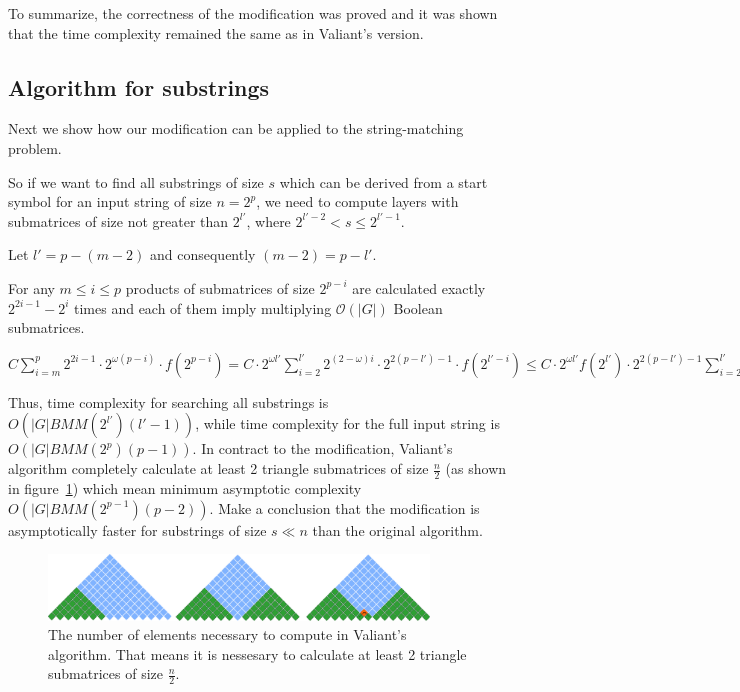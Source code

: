 To summarize, the correctness of the modification was proved and it was shown that the time complexity remained the same as in Valiant's version.

\subsection{Algorithm for substrings}

Next we show how our modification can be applied to the string-matching problem.

So if we want to find all substrings of size $s$ which can be derived from a start symbol for an input string of size $n = 2^p$, we need to compute layers with submatrices of size not greater than $2^{l'}$, where $2^{l' - 2} < s \le 2^{l' - 1}$.

Let $l' = p - (m - 2)$ and consequently $(m - 2) = p - l'$.

For any  $m \le i \le p$ products of submatrices of size $2^{p - i}$ are calculated exactly $2^{2i - 1} - 2^{i}$ times and each of them imply multiplying $\mathcal{O}(|G|)$ Boolean submatrices.

$ C \sum\limits_{i=m}^p 2^{2i - 1} \cdot 2^{\omega(p - i)} \cdot f(2^{p - i}) = C \cdot 2^{\omega l'}\sum\limits_{i=2}^{l'} 2^{(2 - \omega)i} \cdot 2^{2(p - l') - 1} \cdot f(2^{l' - i}) \le C \cdot 2^{\omega l'} f(2^{l'}) \cdot 2^{2(p - l') - 1} \sum\limits_{i=2}^{l'} 2^{(2 - \omega)i} = BMM(2^{l'}) \cdot 2^{2(p - l') - 1} \sum\limits_{i=2}^{l'} 2^{(2 - \omega)i}$

Thus, time complexity for searching all substrings is  $O(|G|BMM(2^{l'})(l' - 1))$, while time complexity for the full input string is $O(|G|BMM(2^p)(p - 1))$. In contract to the modification, Valiant's algorithm completely calculate at least 2 triangle submatrices of size $\frac{n}{2}$ (as shown in figure~\ref{fig5}) which mean minimum asymptotic complexity  $O(|G|BMM(2^{p - 1})(p - 2))$. Make a conclusion that the modification is asymptotically faster for substrings of size $s \ll n$  than the original algorithm.

\begin{figure}
    \centering
    \captionsetup{justification=centering}
    \includegraphics[width=0.9\textwidth]{pictures/valsubstring.pdf}
    \caption{The number of elements necessary to compute in Valiant's algorithm. That means it is nessesary to calculate at least 2 triangle submatrices of size $\frac{n}{2}$.}
    \label{fig5}
\end{figure}
